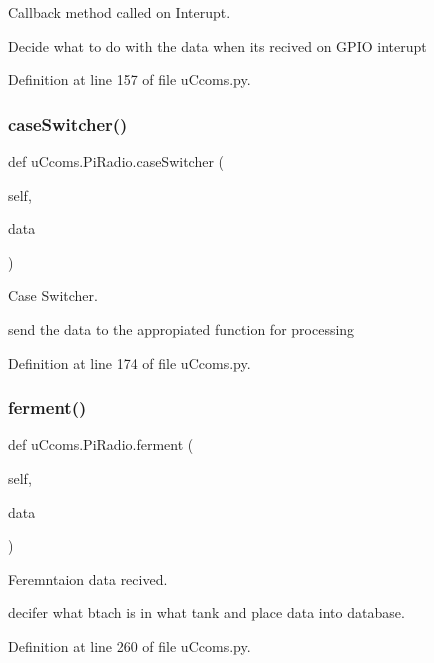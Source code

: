 Callback method called on Interupt. 

Decide what to do with the data when its recived on G\+P\+IO interupt 

Definition at line 157 of file u\+Ccoms.\+py.

\mbox{\label{classu_ccoms_1_1_pi_radio_a1d5a545a875881e2285dab568d56b119}} 
\subsubsection{\texorpdfstring{caseSwitcher()}{caseSwitcher()}}
{\footnotesize\ttfamily def u\+Ccoms.\+Pi\+Radio.\+case\+Switcher (\begin{DoxyParamCaption}\item[{}]{self,  }\item[{}]{data }\end{DoxyParamCaption})}



Case Switcher. 

send the data to the appropiated function for processing 

Definition at line 174 of file u\+Ccoms.\+py.

\mbox{\label{classu_ccoms_1_1_pi_radio_a0a350355ff295c76bb11780aafe38c81}} 
\subsubsection{\texorpdfstring{ferment()}{ferment()}}
{\footnotesize\ttfamily def u\+Ccoms.\+Pi\+Radio.\+ferment (\begin{DoxyParamCaption}\item[{}]{self,  }\item[{}]{data }\end{DoxyParamCaption})}



Feremntaion data recived. 

decifer what btach is in what tank and place data into database. 

Definition at line 260 of file u\+Ccoms.\+py.

\mbox{\label{classu_ccoms_1_1_pi_radio_a20e5d7ecc576a999860cdbda75040dd9}} 
